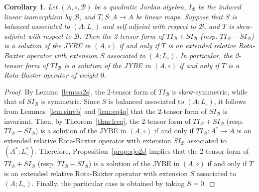 \documentclass[12pt, reqno, a4paper]{amsart}
\newtheorem{corollary}[theorem]{Corollary}
\theoremstyle{definition}
\begin{document}
\begin{corollary}\label{coro:exoqs}
	Let $(A, \circ, \mathcal{B})$ be a quadratic Jordan algebra, $I_\mathcal{B}$ be the induced linear isomorphism by $\mathcal{B}$, and $T, S: A \to A$ be linear maps.
	Suppose that $S$ is balanced associated to $(A; L_{\circ})$ and self-adjoint with respect to $\mathcal{B}$, and $T$ is skew-adjoint with respect to $\mathcal{B}$.
	Then the 2-tensor form of $T I_\mathcal{B} + S I_\mathcal{B}$ (resp. $T I_\mathcal{B} - S I_\mathcal{B}$) is a solution of the JYBE in $(A, \circ)$ if and only if $T$ is an extended relative Rota-Baxter operator with extension $S$ associated to $(A; L_{\circ})$.
	In particular, the 2-tensor form of $T I_\mathcal{B}$ is a solution of the JYBE in $(A, \circ)$ if and only if $T$ is a Rota-Baxter operator of weight $0$.
\end{corollary}
\begin{proof}
	By Lemma~\ref{lem:sa2s}, the 2-tensor form of $T I_\mathcal{B}$ is skew-symmetric, while that of $S I_\mathcal{B}$ is symmetric.
	Since $S$ is balanced associated to $(A; L_{\circ})$, it follows from Lemmas~\ref{lem:sinvb} and \ref{lem:eq4q}   that the 2-tensor form of $S I_\mathcal{B}$ is invariant.
	Then, by Theorem~\ref{thm:lreq}, the 2-tensor form of $T I_\mathcal{B} + S I_\mathcal{B}$ (resp. $T I_\mathcal{B} - S I_\mathcal{B}$) is a solution of the JYBE in $(A, \circ)$ if and only if $T I_\mathcal{B}: A^* \to A$ is an extended relative Rota-Baxter operator with extension $S I_\mathcal{B}$ associated to $(A^*; L_{\circ}^*)$.
	Therefore, Proposition~\ref{prop:ajo2s} implies that the 2-tensor form of $T I_\mathcal{B} + S I_\mathcal{B}$ (resp. $T I_\mathcal{B} - S I_\mathcal{B}$) is a solution of the JYBE in $(A, \circ)$ if and only if $T$ is an extended relative Rota-Baxter operator with extension $S$ associated to $(A; L_{\circ})$.
	Finally, the particular case is obtained by taking $S = 0$.
\end{proof}
\end{document}
